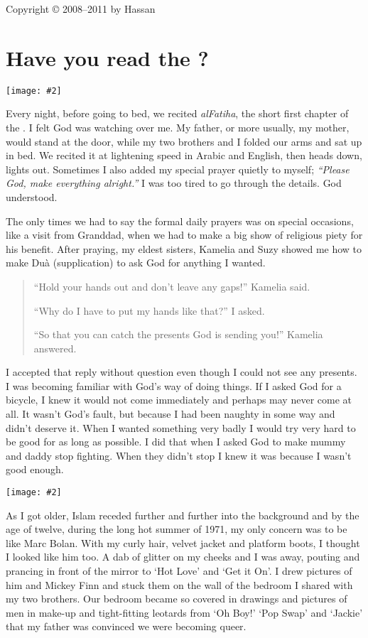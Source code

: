 \documentclass[12pt]{memoir}
\newcommand{\img}[3]{\begin{center}%
\texttt{[image: \#2]}\\{\small\em#3}%
\end{center}}
\begin{document}
\hfill Copyright © 2008–2011 by Hassan

\mainmatter


\chapter{Have you read the \Quran?}

\img{scale=0.7}{Baby_Hassan.jpg}{}

Every night, before going to bed, we recited \emph{al\–Fatiha},
the short first chapter of the \Quran.
I felt God was watching over me.
My father, or more usually, my mother, would stand at the door,
while my two brothers and I folded our arms and sat up in bed.
We recited it at lightening speed in Arabic and English,
then heads down, lights out.
Sometimes I also added my special prayer quietly to myself;
\emph{“Please God, make everything alright.”}
I was too tired to go through the details.
God understood.

The only times we had to say the formal daily prayers was on special occasions,
like a visit from Granddad,
when we had to make a big show of religious piety for his benefit.
After praying, my eldest sisters, Kamelia and Suzy showed me
how to make Du\`a (supplication) to ask God for anything I wanted.

\begin{quote}
“Hold your hands out and don’t leave any gaps!” Kamelia said.

“Why do I have to put my hands like that?” I asked.

“So that you can catch the presents God is sending you!” Kamelia answered.
\end{quote}

I accepted that reply without question
even though I could not see any presents.
I was becoming familiar with God’s way of doing things.
If I asked God for a bicycle, I knew it would not come immediately
and perhaps may never come at all.
It wasn’t God’s fault, but because I had been naughty in some way
and didn’t deserve it.
When I wanted something very badly I would try very hard
to be good for as long as possible.
I did that when I asked God to make mummy and daddy stop fighting.
When they didn’t stop I knew it was because I wasn’t good enough.

\img{scale=1}{Hassan_Boy.jpg}{}

As I got older, Islam receded further and further into the background
and by the age of twelve, during the long hot summer of 1971,
my only concern was to be like Marc Bolan.
With my curly hair, velvet jacket and platform boots,
I thought I looked like him too.
A dab of glitter on my cheeks and I was away,
pouting and prancing in front of the mirror to ‘Hot Love’ and ‘Get it On’.
I drew pictures of him and Mickey Finn
and stuck them on the wall of the bedroom I shared with my two brothers.
Our bedroom became so covered in drawings and pictures of men in make-up
and tight-fitting leotards from ‘Oh Boy!’ ‘Pop Swap’ and ‘Jackie’
that my father was convinced we were becoming queer.
\end{document}
